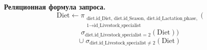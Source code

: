 \textbf{Реляционная формула запроса.}
\[
\text{Diet} \leftarrow \pi_{\substack{
\text{diet.id\_Diet},\, \text{diet.id\_Season},\, \text{diet.id\_Lactation\_phase}, \\
\text{1}{\rightarrow}\text{id\_Livestock\_specialist}
}} (
\]
\[
\sigma_{\text{diet.id\_Livestock\_specialist} = 2} (\text{Diet}))
\]
\[
\cup \; \sigma_{\text{diet.id\_Livestock\_specialist} \neq 2} (\text{Diet})
\]
